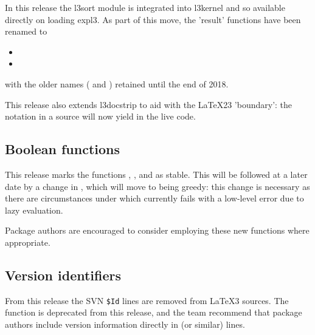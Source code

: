 \documentclass{ltnews}
\begin{document}
In this release the l3sort module is integrated
into l3kernel and so available directly on loading
expl3. As part of this move, the 'result' functions
have been renamed to
\begin{itemize}
\item {}
\item {}
\end{itemize}  
with the older names ( and
) retained until the end of 2018.

This release also extends l3docstrip to aid with
the LaTeX23 'boundary': the notation  in a
source will now yield  in the live code.



\subsection{Boolean functions}

This release marks the functions
,
,
 and
as stable. This will be followed at a later date by a change in
, which will move to being greedy: this change is
necessary as there are circumstances under which 
currently fails with a low-level error due to lazy evaluation.

Package authors are encouraged to consider employing these new functions
where appropriate.

\subsection{Version identifiers}

From this release the SVN \verb=$Id= lines are removed from \LaTeX3 sources. The
function  is deprecated from this release, and the team
recommend that package authors include version information directly in
 (or similar) lines.
\end{document}

